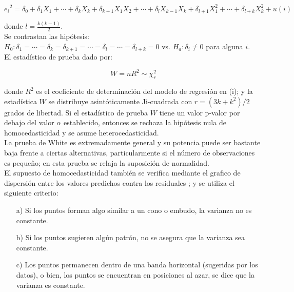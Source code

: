 \begin{center}
	$${e_i} ^2=\delta _0 + \delta _1 X_1+ \cdots + \delta _{k} X_k + \delta _{k+1} X_1 X_2+ \cdots +\delta _l X_{k-1} X_k+  \delta _{l+1} X_1 ^2 + \cdots  + \delta _{l+k} X_k ^2 + u(i)$$
\end{center}


donde  $l=\frac{k(k-1)}{2}$.\\
Se contrastan las hipótesis:\\
$H_0: \delta _1 =  \cdots =\delta _k=\delta _{k+1} =  \cdots =\delta _l= \cdots=\delta_{l+k} =0 $  vs.  $H_a: \delta_i \neq 0$ para alguna $i$.\\

El estadístico de prueba dado por:

\begin{center}
	$$W=n R^2 \sim \chi_r ^2$$
\end{center}


donde $R^2$ es el coeficiente de determinación del modelo de regresión en (i); y la estadística $W$ se distribuye asintóticamente Ji-cuadrada con $r=(3k + k^2)/2$ grados de libertad. Si el estadístico de prueba $W$  tiene un valor p-valor por debajo del valor $\alpha$ establecido, entonces se rechaza la hipótesis nula de homocedasticidad y se asume heterocedasticidad.\\


La prueba de White es extremadamente general y su potencia puede ser bastante baja frente a ciertas alternativas, particularmente si el número de observaciones es pequeño; en esta prueba se relaja la suposición de normalidad. \\
El supuesto de homocedasticidad también se verifica mediante el grafico de dispersión entre los valores predichos  contra los residuales ; y se utiliza el siguiente criterio:\\

\begin{itemize}
	\item[a)] Si los puntos forman algo similar a un cono o embudo, la varianza no es constante.
	
	\item[b)] Si los puntos sugieren algún patrón, no se asegura que la varianza sea constante.
	
	\item[c)] Los puntos permanecen dentro de una banda horizontal (sugeridas por los datos), o bien, los puntos se encuentran en posiciones al azar, se dice que la varianza es constante. 
\end{itemize}



